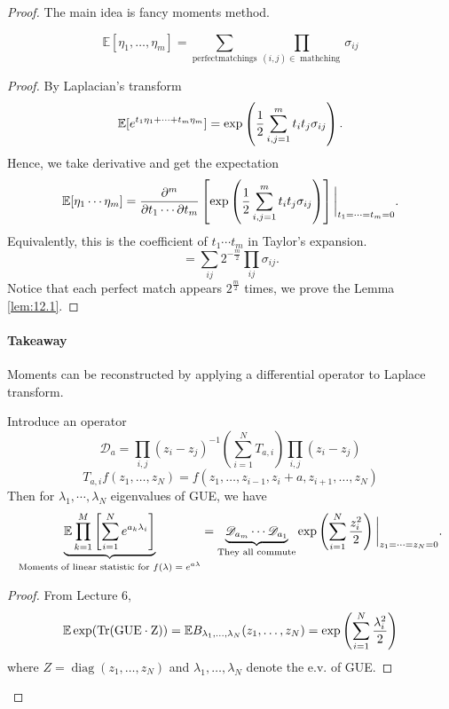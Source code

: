 \begin{proof}
    The main idea is fancy moments method.

\begin{lem}
\label{lem:12.1}
\[
\mathbb{E}[\eta_1,\dots,\eta_m]=\sum_{\operatorname{perfect matchings}}\prod_{(i,j)\in\operatorname{mathching}}\sigma_{ij}
\]
\end{lem}
\begin{proof}
    By Laplacian's transform
    \[
    \mathbb{E} [e^{t_1\eta_1+\cdots +t_m\eta_m}] = \exp\left(\frac{1}{2} \sum_{i,j=1}^m t_it_j\sigma_{ij} \right).
    \]
    Hence, we take derivative and get the expectation
    \[
    \mathbb{E} [\eta_1\cdots\eta_m] = \frac{\partial^m}{\partial t_1\cdots\partial t_m} \left[\exp\left(\frac{1}{2} \sum_{i,j=1}^m t_it_j\sigma_{ij} \right)\right] \bigg|_{t_1 = \cdots = t_m = 0}.
    \]
    Equivalently, this is the coefficient of $t_1\cdots t_m$ in Taylor's expansion.
    \[
    = \sum_{ij} 2^{-\frac{m}{2}} \prod_{ij} \sigma_{ij}.
    \]
    Notice that each perfect match appears $2^{\frac{m}{2}}$ times, we prove the Lemma \ref{lem:12.1}.
\end{proof}

\paragraph{Takeaway} Moments can be reconstructed by applying a differential operator to Laplace transform.

\begin{lem}
\label{lem:12.2}
Introduce an operator
\[
\mathcal{D}_a=\prod_{i,j}(z_i-z_j)^{-1}\left(\sum_{i=1}^NT_{a,i}\right)\prod_{i,j}(z_i-z_j)
\]
\[
T_{a,i}f(z_1,\dots,z_N)=f(z_1,\dots,z_{i-1},z_i+a,z_{i+1},\dots,z_N)
\]
Then for $\lambda_1,\cdots,\lambda_N$ eigenvalues of GUE, we have 
\[
\underbrace{\mathbb{E} \prod_{k=1}^M \left[\sum_{i=1}^N e^{a_k\lambda_i}\right]}_{\text{Moments of linear statistic for $f(\lambda)=e^{a\lambda}$}} = \underbrace{\mathcal{D}_{a_m} \cdots \mathcal{D}_{a_1} }_{\text{They all commute}} \exp\left(\sum_{i=1}^N \frac{z_i^2}{2}\right) \bigg|_{z_1 = \cdots = z_N = 0}.
\]
\end{lem}
\begin{proof}
From Lecture 6,
\[
\mathbb{E}\exp(\operatorname{Tr(GUE\cdot Z)})=\mathbb{E} B_{\lambda_1,\dots,\lambda_N}(z_1,\dots,z_N)=\exp\left(\sum_{i=1}^N\frac{\lambda_i^2}{2}\right)
\]
where $Z=\operatorname{diag}(z_1,\dots,z_N)$ and $\lambda_1,\dots,\lambda_N$ denote the e.v. of GUE.


\end{proof}
\end{proof}
